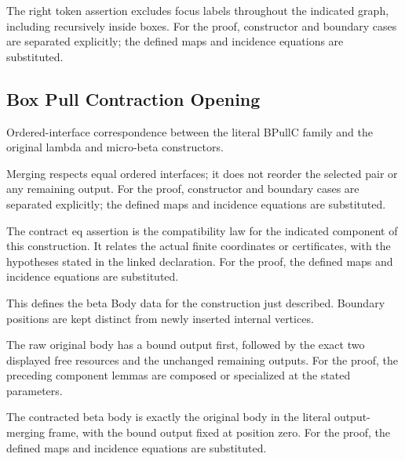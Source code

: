 The right token assertion excludes focus labels throughout the indicated graph, including recursively inside boxes.
For the proof, constructor and boundary cases are separated explicitly; the defined maps and incidence equations are substituted.
\par{}

\subsection{Box Pull Contraction Opening}
Ordered-interface correspondence between the literal BPullC family and the original lambda and micro-beta constructors.

Merging respects equal ordered interfaces; it does not reorder the selected pair or any remaining output.
For the proof, constructor and boundary cases are separated explicitly; the defined maps and incidence equations are substituted.
\par{}

The contract eq assertion is the compatibility law for the indicated component of this construction. It relates the actual finite coordinates or certificates, with the hypotheses stated in the linked declaration.
For the proof, the defined maps and incidence equations are substituted.
\par{}

This defines the beta Body data for the construction just described. Boundary positions are kept distinct from newly inserted internal vertices.
\par{}

The raw original body has a bound output first, followed by the exact two displayed free resources and the unchanged remaining outputs.
For the proof, the preceding component lemmas are composed or specialized at the stated parameters.
\par{}

The contracted beta body is exactly the original body in the literal output-merging frame, with the bound output fixed at position zero.
For the proof, the defined maps and incidence equations are substituted.
\par{}

